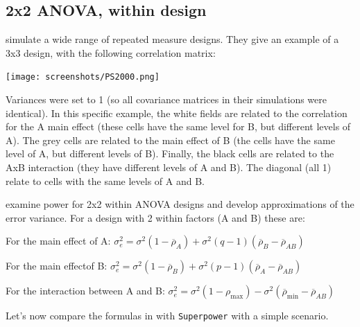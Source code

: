 \documentclass[
]{book}
\begin{document}
\hypertarget{x2-anova-within-design}{%
\subsection{2x2 ANOVA, within design}\label{x2-anova-within-design}}

\citet{potvin2000statistical} simulate a wide range of repeated measure designs. They give an example of a 3x3 design, with the following correlation matrix:

\texttt{[image: screenshots/PS2000.png]}

Variances were set to 1 (so all covariance matrices in their simulations were identical). In this specific example, the white fields are related to the correlation for the A main effect (these cells have the same level for B, but different levels of A). The grey cells are related to the main effect of B (the cells have the same level of A, but different levels of B). Finally, the black cells are related to the AxB interaction (they have different levels of A and B). The diagonal (all 1) relate to cells with the same levels of A and B.

\citet{potvin2000statistical} examine power for 2x2 within ANOVA designs and develop approximations of the error variance. For a design with 2 within factors (A and B) these are:

For the main effect of A:
\(\sigma _ { e } ^ { 2 } = \sigma ^ { 2 } ( 1 - \overline { \rho } _ { A } ) + \sigma ^ { 2 } ( q - 1 ) ( \overline { \rho } _ { B } - \overline { \rho } _ { AB } )\)

For the main effectof B:
\(\sigma _ { e } ^ { 2 } = \sigma ^ { 2 } ( 1 - \overline { \rho } _ { B } ) + \sigma ^ { 2 } ( p - 1 ) ( \overline { \rho } _ { A } - \overline { \rho } _ { A B } )\)

For the interaction between A and B:
\(\sigma _ { e } ^ { 2 } = \sigma ^ { 2 } ( 1 - \rho _ { \max } ) - \sigma ^ { 2 } ( \overline { \rho } _ { \min } - \overline { \rho } _ { AB } )\)

Let's now compare the formulas in \citet{potvin2000statistical} with \texttt{Superpower} with a simple scenario.
\end{document}

